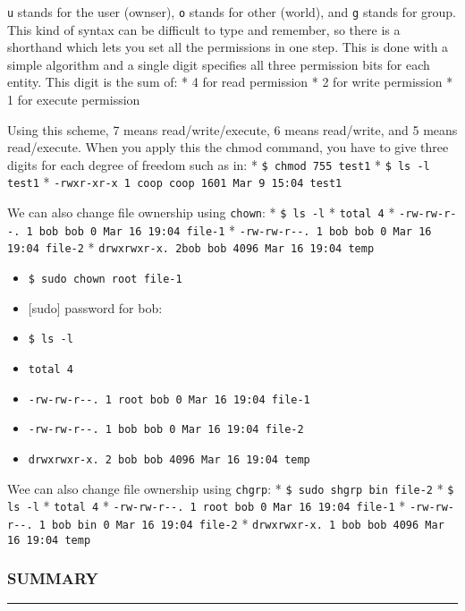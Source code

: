 \texttt{u} stands for the user (ownser), \texttt{o} stands for other
(world), and \texttt{g} stands for group. This kind of syntax can be
difficult to type and remember, so there is a shorthand which lets you
set all the permissions in one step. This is done with a simple
algorithm and a single digit specifies all three permission bits for
each entity. This digit is the sum of: * 4 for read permission * 2 for
write permission * 1 for execute permission

Using this scheme, 7 means read/write/execute, 6 means read/write, and 5
means read/execute. When you apply this the chmod command, you have to
give three digits for each degree of freedom such as in: *
\texttt{\$ chmod 755 test1} * \texttt{\$ ls -l test1} *
\texttt{-rwxr-xr-x 1 coop coop 1601 Mar 9 15:04 test1}

We can also change file ownership using \texttt{chown}: *
\texttt{\$ ls -l} * \texttt{total 4} *
\texttt{-rw-rw-r-\/-. 1 bob bob 0 Mar 16 19:04 file-1} *
\texttt{-rw-rw-r-\/-. 1 bob bob 0 Mar 16 19:04 file-2} *
\texttt{drwxrwxr-x. 2bob bob 4096 Mar 16 19:04 temp}

\begin{itemize}
\item
  \texttt{\$ sudo chown root file-1}
\item
  {[}sudo{]} password for bob:
\item
  \texttt{\$ ls -l}
\item
  \texttt{total 4}
\item
  \texttt{-rw-rw-r-\/-. 1 root bob 0 Mar 16 19:04 file-1}
\item
  \texttt{-rw-rw-r-\/-. 1 bob bob 0 Mar 16 19:04 file-2}
\item
  \texttt{drwxrwxr-x. 2 bob bob 4096 Mar 16 19:04 temp}
\end{itemize}

Wee can also change file ownership using \texttt{chgrp}: *
\texttt{\$ sudo shgrp bin file-2} * \texttt{\$ ls -l} * \texttt{total 4}
* \texttt{-rw-rw-r-\/-. 1 root bob 0 Mar 16 19:04 file-1} *
\texttt{-rw-rw-r-\/-. 1 bob bin 0 Mar 16 19:04 file-2} *
\texttt{drwxrwxr-x. 1 bob bob 4096 Mar 16 19:04 temp}

\subsubsection{SUMMARY}\label{summary-7}

\begin{center}\rule{3in}{0.4pt}\end{center}

